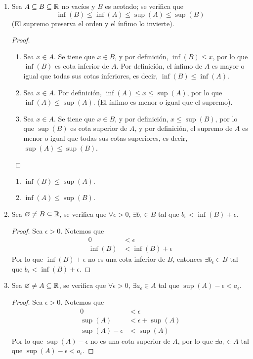 \begin{enumerate}[label=\alph*)]
\item Sea $A\subseteq B\subseteq \mathbb{R}$ no vacíos y $B$ es acotado; se verifica que \[\inf (B) \leq \inf (A) \leq \sup (A) \leq \sup (B)\] (El supremo preserva el orden y el ínfimo lo invierte).

  \begin{proof}\leavevmode
    \begin{enumerate}[label=\roman*)]
      \item Sea $x\in A$. Se tiene que $x\in B$, y por definición, $\inf (B) \leq x$, por lo que $\inf (B)$ es cota inferior de $A$. Por definición, el ínfimo de $A$ es mayor o igual que todas sus cotas inferiores, es decir, $\inf (B) \leq \inf (A)$.
      \item Sea $x\in A$. Por definición, $\inf (A) \leq x \leq \sup (A)$, por lo que $\inf (A) \leq \sup (A)$. (El ínfimo es menor o igual que el supremo).
      \item Sea $x\in A$. Se tiene que $x\in B$, y por definición, $x\leq \sup (B)$, por lo que $\sup (B)$ es cota superior de $A$, y por definición, el supremo de $A$ es menor o igual que todas sus cotas superiores, es decir, $\sup (A) \leq \sup (B)$. \qedhere
    \end{enumerate}
  \end{proof}
  
  \begin{enumerate}[label=\roman*)]
  \item $\inf (B) \leq \sup (A)$.
  \item $\inf (A) \leq \sup (B)$.
  \end{enumerate}
  \item Sea $\varnothing \neq B\subseteq \mathbb{R}$, se verifica que $\forall \epsilon > 0$, $\exists b_\epsilon\in B$ tal que $b_\epsilon < \inf (B) + \epsilon$.
  
  \begin{proof}\leavevmode
    Sea $\epsilon >0$. Notemos que
    \begin{align*}
      0 &< \epsilon\\
      \inf (B) &< \inf (B) + \epsilon
    \end{align*}
    Por lo que $\inf (B) +\epsilon$ no es una cota inferior de $B$, entonces $\exists b_\epsilon\in B$ tal que $b_\epsilon < \inf (B) + \epsilon$.
  \end{proof}
  
  \item Sea $\varnothing \neq A\subseteq \mathbb{R}$, se verifica que $\forall \epsilon > 0$, $\exists a_\epsilon\in A$ tal que $\sup (A) - \epsilon < a_\epsilon$.
  \begin{proof}\leavevmode
    Sea $\epsilon>0$. Notemos que 
    \begin{align*}
      0 &< \epsilon\\
      \sup (A) &< \epsilon + \sup (A)\\
      \sup (A) - \epsilon &< \sup (A)
    \end{align*}
    Por lo que $\sup (A)-\epsilon$ no es una cota superior de $A$, por lo que $\exists a_\epsilon\in A$ tal que $\sup (A) - \epsilon < a_\epsilon$.
  \end{proof}
  

\end{enumerate}
